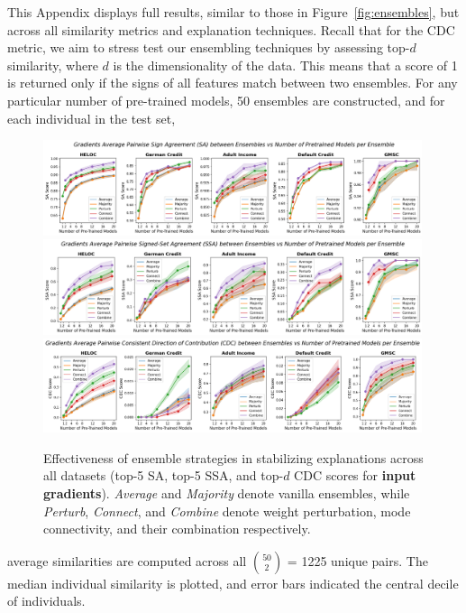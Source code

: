 This Appendix displays full results, similar to those in Figure~\ref{fig:ensembles}, but across all similarity metrics and explanation techniques. Recall that for the CDC metric, we aim to stress test our ensembling techniques by assessing top-$d$ similarity, where $d$ is the dimensionality of the data. This means that a score of 1 is returned only if the signs of all features match between two ensembles. For any particular number of pre-trained models, 50 ensembles are constructed, and for each individual in the test set, 

\begin{figure}[hb]
    \centering
    \includegraphics[width=0.99\textwidth]{figures/sa_top5_gradients.png}
    \includegraphics[width=0.99\textwidth]{figures/ssa_top5_gradients.png}
    \includegraphics[width=0.99\textwidth]{figures/cdc_topd_gradients.png}
    \caption{\small Effectiveness of ensemble strategies in stabilizing explanations across all datasets (top-5 SA, top-5 SSA, and top-$d$ CDC scores for \textbf{input gradients}). \textit{Average} and \textit{Majority} denote vanilla ensembles, while \textit{Perturb}, \textit{Connect}, and \textit{Combine} denote weight perturbation, mode connectivity, and their combination respectively.}
    \label{fig:ensembles_all}
\end{figure}
average similarities are computed across all $\binom{50}{2}$ = 1225 unique pairs. The median individual similarity is plotted, and error bars indicated the central decile of individuals.

